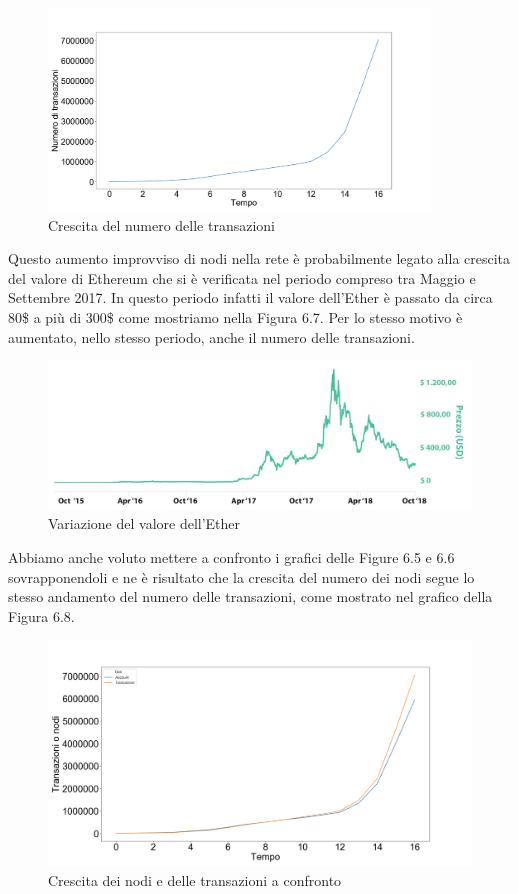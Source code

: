 \documentclass[12pt]{report}
\begin{document}
\begin{figure}[H]
\centering  
\includegraphics[width=0.9\textwidth]{PlotArchi.png}
\caption{Crescita del numero delle transazioni}
\end{figure}

Questo aumento improvviso di nodi nella rete è probabilmente legato alla crescita del valore di Ethereum che si è verificata nel periodo compreso tra Maggio e Settembre 2017. In questo periodo infatti il valore dell'Ether è passato da circa 80\$ a più di 300\$ come mostriamo nella Figura 6.7. Per lo stesso motivo è aumentato, nello stesso periodo, anche il numero delle transazioni.

\begin{figure}[H]
\centering  
\includegraphics[width=\textwidth]{chart-2.jpg}
\caption{Variazione del valore dell'Ether}
\end{figure}


Abbiamo anche voluto mettere a confronto i grafici delle Figure 6.5 e 6.6 sovrapponendoli e ne è risultato che la crescita del numero dei nodi segue lo stesso andamento del numero delle transazioni, come mostrato nel grafico della Figura 6.8.

\begin{figure}[H]
    \includegraphics[width=\textwidth]{NodiETransazioni.png}
    \caption{Crescita dei nodi e delle transazioni a confronto}
\end{figure}
\end{document}
